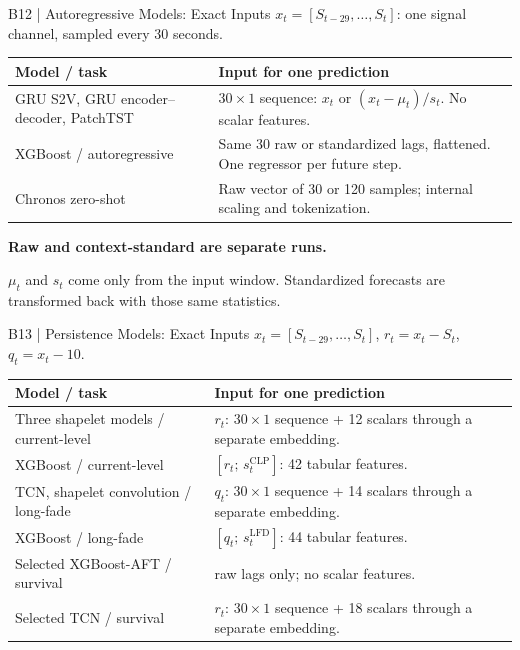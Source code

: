 \begin{frame}[noframenumbering]{B12 | Autoregressive Models: Exact Inputs}
\small $x_t=[S_{t-29},\ldots,S_t]$: one signal channel, sampled every 30 seconds.\par
\vspace{3mm}
\renewcommand{\arraystretch}{1.35}
\begin{tabularx}{\textwidth}{@{}>{\raggedright\arraybackslash}p{59mm}>{\raggedright\arraybackslash}X@{}}
\toprule
Model / task & Input for one prediction\\\midrule
GRU S2V, GRU encoder--decoder, PatchTST & $30\times1$ sequence: $x_t$ or $(x_t-\mu_t)/s_t$. No scalar features.\\
XGBoost / autoregressive & Same 30 raw or standardized lags, flattened. One regressor per future step.\\
Chronos zero-shot & Raw vector of 30 or 120 samples; internal scaling and tokenization.\\
\bottomrule
\end{tabularx}\par
\vspace{3mm}
\textbf{Raw and context-standard are separate runs.}\par
$\mu_t$ and $s_t$ come only from the input window. Standardized forecasts are transformed back with those same statistics.
\end{frame}

\begin{frame}[noframenumbering]{B13 | Persistence Models: Exact Inputs}
\small $x_t=[S_{t-29},\ldots,S_t]$,\quad
$r_t=x_t-S_t$,\quad $q_t=x_t-10$.\par
\vspace{3mm}
\renewcommand{\arraystretch}{1.28}
\begin{tabularx}{\textwidth}{@{}>{\raggedright\arraybackslash}p{59mm}>{\raggedright\arraybackslash}X@{}}
\toprule
Model / task & Input for one prediction\\\midrule
Three shapelet models / current-level & $r_t$: $30\times1$ sequence + 12 scalars through a separate embedding.\\
XGBoost / current-level & $[r_t;\,s_t^{\mathrm{CLP}}]$: 42 tabular features.\\
TCN, shapelet convolution / long-fade & $q_t$: $30\times1$ sequence + 14 scalars through a separate embedding.\\
XGBoost / long-fade & $[q_t;\,s_t^{\mathrm{LFD}}]$: 44 tabular features.\\
Selected XGBoost-AFT / survival & 30 raw lags only; no scalar features.\\
Selected TCN / survival & $r_t$: $30\times1$ sequence + 18 scalars through a separate embedding.\\
\bottomrule
\end{tabularx}
\end{frame}

